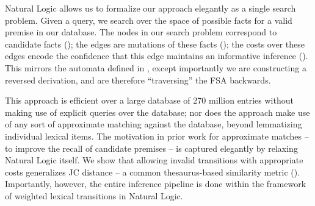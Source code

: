 

Natural Logic allows us to formalize our approach elegantly as
  a single search problem.
Given a query, we search over the space of possible facts for
  a valid premise in our database.
The nodes in our search problem correspond to candidate facts
  ();
  the edges are mutations of these facts (); 
  the costs over these edges encode the confidence that this edge
  maintains an informative inference ().
This mirrors the automata defined in , except importantly
  we are constructing a reversed derivation, and are therefore
  ``traversing'' the FSA backwards.

This approach is efficient over a large database of 270 million entries
  without making use of explicit queries over the database;
  nor does the approach make use of any sort of approximate
  matching against the database, beyond lemmatizing individual 
  lexical items.
The motivation in prior work for approximate matches --
  to improve the recall of candidate premises -- is captured
  elegantly by relaxing Natural Logic itself.
We show that allowing invalid transitions with appropriate costs
  generalizes JC distance \cite{key:1997jc-similarity} -- a common
  thesaurus-based similarity metric ().
Importantly, however, the entire inference pipeline is done
  within the framework of weighted lexical transitions in Natural
  Logic.


